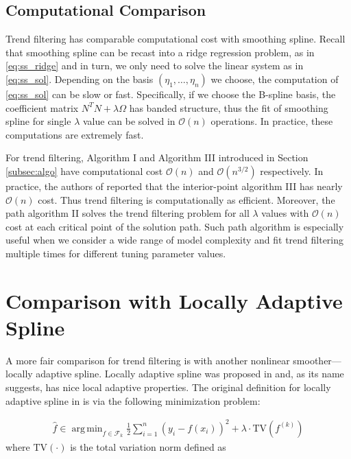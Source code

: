 \documentclass[a4paper]{article}
\DeclareMathOperator*{\argmin}{arg\,min}
\renewcommand{\cal}{\mathcal}
\begin{document}
\subsection{Computational Comparison}
\label{subsec:sscomp}
Trend filtering has comparable computational cost with smoothing spline. Recall that smoothing spline can be recast into a ridge regression problem, as in \eqref{eq:ss_ridge} and in turn, we only need to solve the linear system as in \eqref{eq:ss_sol}. Depending on the basis $(\eta_1,\ldots, \eta_n)$ we choose, the computation of \eqref{eq:ss_sol} can be slow or fast. Specifically, if we choose the B-spline basis, the coefficient matrix $N^TN+\lambda\Omega$ has banded structure, thus the fit of smoothing spline for single $\lambda$ value can be solved in $\cal{O}(n)$ operations. In practice, these computations are extremely fast. 

For trend filtering, Algorithm I and Algorithm III introduced in Section \ref{subsec:algo} have computational cost $\cal{O}(n)$ and $\cal{O}(n^{3/2})$ respectively. In practice, the authors of \cite{kim2009ell_1} reported that the interior-point algorithm III has nearly $\cal{O}(n)$ cost. Thus trend filtering is computationally as efficient. Moreover, the path algorithm II solves the trend filtering problem for all $\lambda$ values with $\cal{O}(n)$ cost at each critical point of the solution path. Such path algorithm is especially useful when we consider a wide range of model complexity and fit trend filtering multiple times for different tuning parameter values.

\section{Comparison with Locally Adaptive Spline}
\label{sec:las_compare}

A more fair comparison for trend filtering is with another nonlinear smoother---locally adaptive spline. Locally adaptive spline was proposed in \cite{mammen1997locally} and, as its name suggests, has nice local adaptive properties. The original definition for locally adaptive spline in \cite{mammen1997locally} is via the following minimization problem:

\begin{align}
\hat{f} \in \argmin_{f\in\cal{F}_k} \frac{1}{2}\sum_{i=1}^n (y_i - f(x_i))^2 + \lambda\cdot\text{TV}(f^{(k)})
\label{eq:las_unconstrained}
\end{align}
where $\text{TV}(\cdot)$ is the total variation norm defined as 
\end{document}
